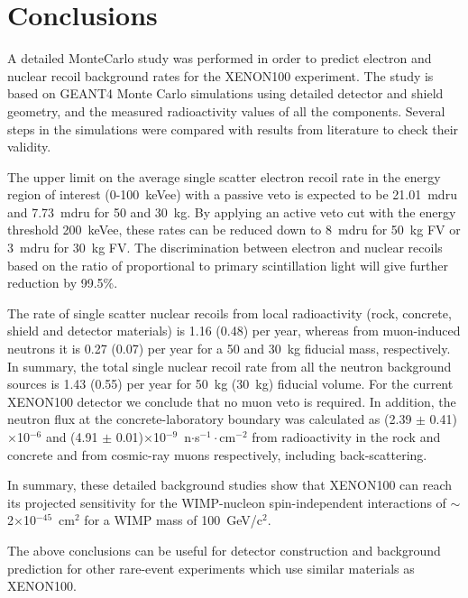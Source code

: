 \section{Conclusions} \label{summary}

A detailed MonteCarlo study was performed in order to predict electron and nuclear recoil background rates for the 
XENON100 experiment. The study is based on GEANT4 Monte Carlo simulations using detailed detector and shield geometry, and the measured radioactivity values of all the components. 
Several steps in the simulations were compared with results from literature
to check their validity.

The upper limit on the average single scatter electron recoil rate in the energy region of interest (0-100~keVee) with a passive veto is expected to be 21.01~mdru and 7.73~mdru for 50 and 30~kg. By applying an active veto cut with the energy threshold 200~keVee, these rates can be reduced down to 8~mdru for 50~kg FV or 3~mdru for 30~kg FV. The discrimination between electron and nuclear recoils based on the ratio of proportional to primary scintillation light will give further reduction by 99.5\%.

The rate of single scatter nuclear recoils from local radioactivity (rock, concrete, 
shield and detector materials) is 1.16 (0.48) per
year, whereas from muon-induced neutrons it is 0.27 (0.07) per
year for a 50 and 30~kg fiducial mass, respectively. 
In summary, the total single nuclear recoil rate from all the neutron background sources is
1.43 (0.55) per year for 50~kg (30~kg) fiducial volume.
For the current XENON100 detector we conclude that no muon veto is required.
In addition, the neutron flux at the concrete-laboratory boundary was calculated as 
(2.39 $\pm$ 0.41)$\times$10$^{-6}$ and (4.91 $\pm$ 0.01)$\times$10$^{-9}$~n$\cdot$s$^{-1}\cdot$cm$^{-2}$ from
radioactivity in the rock and concrete and from cosmic-ray muons respectively, 
including back-scattering.

In summary, these detailed background studies show that XENON100 can reach its projected sensitivity for the WIMP-nucleon spin-independent 
interactions of $\sim$2$\times$10$^{-45}$~cm$^2$ for a WIMP mass of 100~GeV/c$^2$.

The above conclusions can be useful for detector construction and background
prediction for other rare-event experiments which use similar materials as XENON100.


